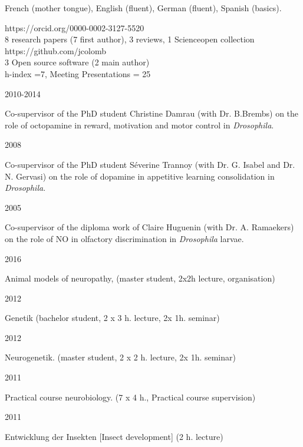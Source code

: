  French (mother tongue), English (fluent),
German (fluent), Spanish (basics).

%
 https://orcid.org/0000-0002-3127-5520\\
  8 research papers (7 first author), 3 reviews, 1 Scienceopen collection\\
 https://github.com/jcolomb\\
 3 Open source software (2 main author)\\
h-index =7,
Meeting Presentations = 25




\parbox{0.15\textwidth}{2010-2014}\hfill
	\parbox[t]{0.83\textwidth}{Co-supervisor of the PhD student Christine Damrau
(with Dr. B.Brembs) on the role of octopamine in reward, motivation and motor control in  \textit{Drosophila}.}
\parbox{0.15\textwidth}{2008}\hfill
	\parbox[t]{0.83\textwidth}{Co-supervisor of the PhD student S\'everine Trannoy
(with Dr. G. Isabel and Dr. N. Gervasi) on the role of dopamine in appetitive learning consolidation in  \textit{Drosophila}.}
\parbox{0.15\textwidth}{2005}\hfill
\parbox[t]{0.83\textwidth}{Co-supervisor of the diploma work of Claire Huguenin
(with Dr. A. Ramaekers) on the role of NO in olfactory discrimination in \textit{Drosophila} larvae.}





\parbox{0.15\textwidth}{2016}\hfill
\parbox[t]{0.83\textwidth}{Animal models of neuropathy, (master student, 2x2h lecture, organisation)}

\parbox{0.15\textwidth}{2012}\hfill
\parbox[t]{0.83\textwidth}{Genetik (bachelor student, 2 x 3 h. lecture, 2x 1h. seminar)}
\parbox{0.15\textwidth}{2012}\hfill
\parbox[t]{0.83\textwidth}{Neurogenetik. (master student, 2 x 2 h. lecture, 2x 1h. seminar)}
\parbox{0.15\textwidth}{2011}\hfill
\parbox[t]{0.83\textwidth}{Practical course neurobiology. (7 x 4 h., Practical course supervision)}
\parbox{0.15\textwidth}{2011}\hfill
\parbox[t]{0.83\textwidth}{Entwicklung der Insekten [Insect development] (2 h. lecture)}
 
